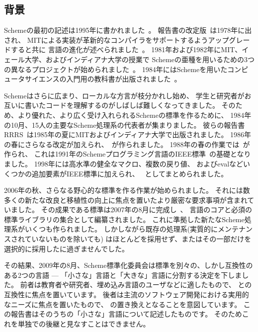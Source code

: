 \subsection*{背景}

\vest Schemeの最初の記述は1995年に書かれました~\cite{Scheme75}。
報告書の改定版~\cite{Scheme78}は1978年に出され、
MITによる実装が革新的なコンパイラをサポートするようアップグレードすると共に
言語の進化が述べられました~\cite{Rabbit}。
1981年および1982年にMIT、イェール大学、およびインディアナ大学の授業で
Schemeの亜種を用いるための3つの異なるプロジェクトが始められました~\cite{Rees82,MITScheme,Scheme311}。
1984年にはSchemeを用いたコンピュータサイエンスの入門用の教科書が出版されました~\cite{SICP}。

\vest Schemeはさらに広まり、ローカルな方言が枝分かれし始め、
学生と研究者がお互いに書いたコードを理解するのがしばしば難しくなってきました。
そのため、より優れた、より広く受け入れられるSchemeの標準を作るために、
1984年の10月、15人の主要なScheme処理系の代表者が集まりました。
彼らの報告書RRRS~\cite{RRRS}は1985年の夏にMITおよびインディアナ大学で出版されました。
1986年の春にさらなる改定が加えられ、\rthreers~\cite{R3RS}が作られました。
1988年の春の作業では\rfourrs~\cite{R4RS}が作られ、
これは1991年のSchemeプログラミング言語のIEEE標準~\cite{IEEEScheme}の基礎となりました。
1998年には高水準の健全なマクロ、複数の戻り値、
およびevalなどいくつかの追加要素がIEEE標準に加えられ、
\rfivers~\cite{R5RS}としてまとめられました。


2006年の秋、さらなる野心的な標準を作る作業が始められました。
それには数多くの新たな改良と移植性の向上に焦点を置いたより厳密な要求事項が含まれていました。
その成果である標準\rsixrs{}は2007年の8月に完成し~\cite{R6RS}、
言語のコアと必須の標準ライブラリの集合として編纂されました。
これに準拠した新たなScheme処理系がいくつも作られました。
しかしながら既存の\rfivers{}処理系(実質的にメンテナンスされていないものを除いても)
はほとんど\rsixrs{}を採用せず、またはその一部だけを選択的に採用したに過ぎませんでした。

その結果、2009年の8月、Scheme標準化委員会は標準を別々の、しかし互換性のある2つの言語
--- 「小さな」言語と「大きな」言語に分割する決定を下しました。
前者は教育者や研究者、埋め込み言語のユーザなどに適したもので、
\rfivers{}との互換性に焦点を置いています。
後者は主流のソフトウェア開発における実用的なニーズに焦点を置いたもので、
\rsixrs{}の置き換えとなることを意図しています。
この報告書はそのうちの「小さな」言語について記述したものです。
そのためこれを単独で\rsixrs{}の後継と見なすことはできません。



